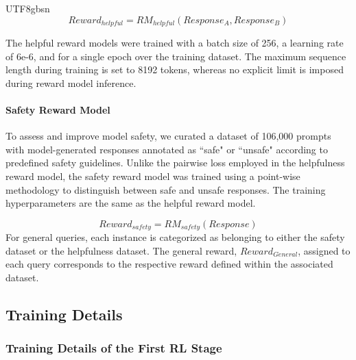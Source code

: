 \documentclass[11pt, a4paper, logo, copyright, nonumbering]{deepseek}
\begin{document}
\begin{CJK*}{UTF8}{gbsn}
\begin{equation} 
    Reward_{helpful} = RM_{helpful}(Response_A, Response_B)
\end{equation}

The helpful reward models were trained with a batch size of 256, a learning rate of 6e-6, and for a single epoch over the training dataset. The maximum sequence length during training is set to 8192 tokens, whereas no explicit limit is imposed during reward model inference. 

\paragraph{Safety Reward Model}
To assess and improve model safety, we curated a dataset of 106,000 prompts with model-generated responses annotated as ``safe" or ``unsafe" according to predefined safety guidelines. Unlike the pairwise loss employed in the helpfulness reward model, the safety reward model was trained using a point-wise methodology to distinguish between safe and unsafe responses. The training hyperparameters are the same as the helpful reward model. 

\begin{equation}
    Reward_{safety} = RM_{safety}(Response)
\end{equation}
For general queries, each instance is categorized as belonging to either the safety dataset or the helpfulness dataset. The general reward, $Reward_{General}$, assigned to each query corresponds to the respective reward defined within the associated dataset. 

\subsection{Training Details}

\label{sec:rl-detail}
\subsubsection{Training Details of the First RL Stage} \label{sec: r1-1-rl}


\end{CJK*}
\end{document}
